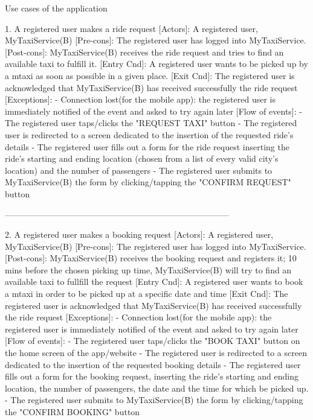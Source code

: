 \documentclass[11pt]{article} %
\begin{document}
    Use cases of the application

      1. A registered user makes a ride request
        [Actors]: A registered user, MyTaxiService(B)
        [Pre-cons]: The registered user has logged into MyTaxiService.
        [Post-cons]: MyTaxiService(B) receives the ride request and tries to find an available taxi to fulfill it.
        [Entry Cnd]: A registered user wants to be picked up by a mtaxi as soon as possible in a given place.
        [Exit Cnd]: The registered user is acknowledged that MyTaxiService(B) has received successfully the ride
        request
        [Exceptions]:
          - Connection lost(for the mobile app): the registered user is immediately notified of the event and
          asked to try again later
        [Flow of events]:
          - The registered user taps/clicks the "REQUEST TAXI" button
          - The registered user is redirected to a screen dedicated to the insertion
          of the requested ride's details
          - The registered user fills out a form for the ride request inserting the ride's starting and ending location
          (chosen from a list of every valid city's location) and the number of passengers
          - The registered user submits to MyTaxiService(B) the form by clicking/tapping the "CONFIRM REQUEST" button

      --------------------------------------------------------------------------------

      2. A registered user makes a booking request
         [Actors]: A registered user, MyTaxiService(B)
         [Pre-cons]: The registered user has logged into MyTaxiService.
         [Post-cons]: MyTaxiService(B) receives the booking request and registers it; 10 mins before
         the chosen picking up time, MyTaxiService(B) will try to find an available taxi to fullfill the request
         [Entry Cnd]: A registered user wants to book a mtaxi in order to be picked up at a specific date and time
         [Exit Cnd]: The registered user is acknowledged that MyTaxiService(B) has received successfully the ride
         request
         [Exceptions]:
           - Connection lost(for the mobile app): the registered user is immediately notified of the event and
           asked to try again later
         [Flow of events]:
           - The registered user taps/clicks the "BOOK TAXI" button on the home screen of the app/website
           - The registered user is redirected to a screen dedicated to the insertion
           of the requested booking details
           - The registered user fills out a form for the booking request, inserting the ride's starting and ending location,
           the number of passengers, the date and the time for which be picked up.
           - The registered user submits to MyTaxiService(B) the form by clicking/tapping the "CONFIRM BOOKING" button
\end{document}
